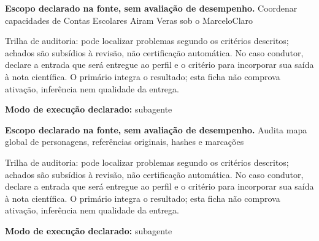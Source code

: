 \begin{descricao}
\textbf{Escopo declarado na fonte, sem avaliação de desempenho.}
Coordenar capacidades de Contas Escolares Airam Veras sob o MarceloClaro
\end{descricao}

\begin{funcao}
Trilha de auditoria: pode localizar problemas segundo os critérios descritos; achados são subsídios à revisão, não certificação automática. No caso condutor, declare a entrada que será entregue ao perfil e o critério para incorporar sua saída à nota científica. O primário integra o resultado; esta ficha não comprova ativação, inferência nem qualidade da entrega.
\end{funcao}

\begin{arquitetura}
\textbf{Modo de execução declarado:} subagente
\end{arquitetura}


\begin{descricao}
\textbf{Escopo declarado na fonte, sem avaliação de desempenho.}
Audita mapa global de personagens, referências originais, hashes e marcações
\end{descricao}

\begin{funcao}
Trilha de auditoria: pode localizar problemas segundo os critérios descritos; achados são subsídios à revisão, não certificação automática. No caso condutor, declare a entrada que será entregue ao perfil e o critério para incorporar sua saída à nota científica. O primário integra o resultado; esta ficha não comprova ativação, inferência nem qualidade da entrega.
\end{funcao}

\begin{arquitetura}
\textbf{Modo de execução declarado:} subagente
\end{arquitetura}



